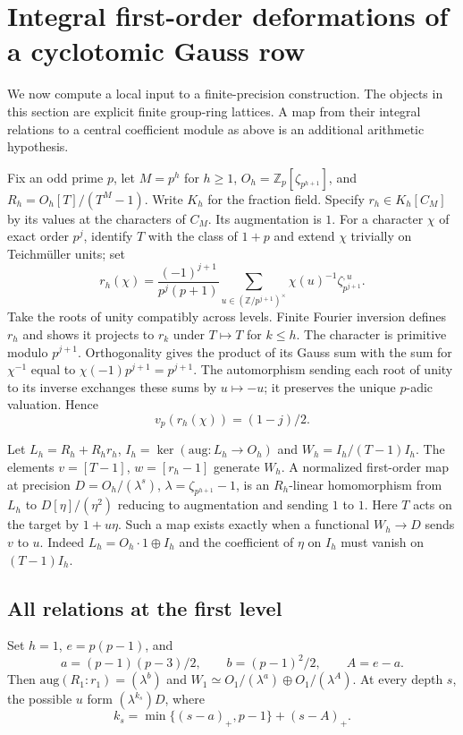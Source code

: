 \documentclass[11pt]{article}
\begin{document}
\section{Integral first-order deformations of a cyclotomic Gauss row}
We now compute a local input to a finite-precision construction. The
objects in this section are explicit finite group-ring lattices. A
map from their integral relations to a central coefficient module
as above is an additional arithmetic hypothesis.

Fix an odd prime $p$, let $M=p^h$ for $h\ge1$,
$O_h=\mathbb Z_p[\zeta_{p^{h+1}}]$, and $R_h=O_h[T]/(T^M-1)$.
Write $K_h$ for the fraction field. Specify $r_h\in K_h[C_M]$ by its
values at the characters of $C_M$. Its augmentation is $1$. For a
character $\chi$ of exact order $p^j$, identify $T$ with the class of
$1+p$ and extend $\chi$ trivially on Teichm\"uller units; set
\[
 r_h(\chi)=\frac{(-1)^{j+1}}{p^j(p+1)}
   \sum_{u\in(\mathbb Z/p^{j+1})^\times}\chi(u)^{-1}
                   \zeta_{p^{j+1}}^{,u}.
\]
Take the roots of unity compatibly across levels. Finite Fourier inversion
defines $r_h$ and shows it projects to $r_k$ under $T\mapsto T$ for $k\le h$.
The character is primitive modulo $p^{j+1}$. Orthogonality gives the
product of its Gauss sum with the sum for $\chi^{-1}$ equal to
$\chi(-1)p^{j+1}=p^{j+1}$. The automorphism sending each root of
unity to its inverse exchanges these sums by $u\mapsto-u$; it preserves
the unique $p$-adic valuation. Hence
\begin{equation}\label{eq:gauss-size}
 v_p(r_h(\chi))=(1-j)/2.
\end{equation}

Let $L_h=R_h+R_hr_h$, $I_h=\ker(\mathrm{aug}:L_h\to O_h)$ and
$W_h=I_h/(T-1)I_h$. The elements $v=[T-1]$, $w=[r_h-1]$ generate
$W_h$. A normalized first-order map at precision $D=O_h/(\lambda^s)$,
$\lambda=\zeta_{p^{h+1}}-1$, is an $R_h$-linear homomorphism from $L_h$
to $D[\eta]/(\eta^2)$ reducing to augmentation and sending $1$ to $1$.
Here $T$ acts on the target by $1+u\eta$. Such a map exists exactly when a
functional $W_h\to D$ sends $v$ to $u$. Indeed $L_h=O_h\cdot1\oplus I_h$
and the coefficient of $\eta$ on $I_h$ must vanish on $(T-1)I_h$.

\subsection{All relations at the first level}
Set $h=1$, $e=p(p-1)$, and
\[
 a=(p-1)(p-3)/2,\qquad b=(p-1)^2/2,\qquad A=e-a .
\]
Then $\mathrm{aug}(R_1:r_1)=(\lambda^b)$ and
$W_1\simeq O_1/(\lambda^a)\oplus O_1/(\lambda^A)$.
At every depth $s$, the possible $u$ form $(\lambda^{k_s})D$, where
\[
 k_s=\min\{(s-a)_+,p-1\}+(s-A)_+ .
\]
\end{document}
